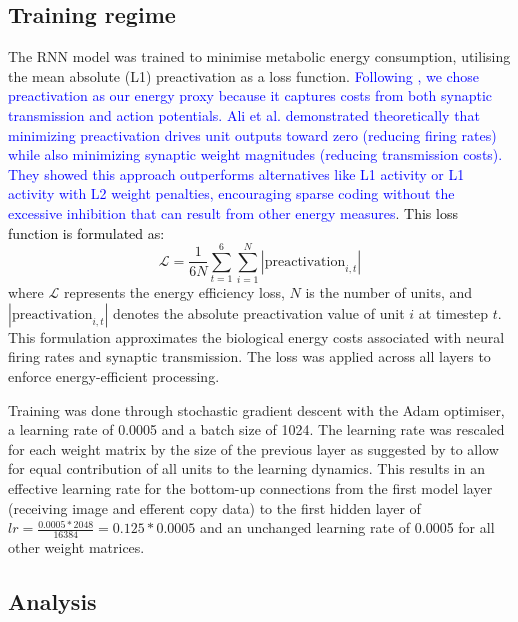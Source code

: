\documentclass[10pt,letterpaper]{article}
\begin{document}
\subsection{Training regime}
The RNN model was trained to minimise metabolic energy consumption, utilising the mean absolute (L1) preactivation as a loss function. \textcolor{blue}{Following \cite{ali_predictive_2022}, we chose preactivation as our energy proxy because it captures costs from both synaptic transmission and action potentials. Ali et al. demonstrated theoretically that minimizing preactivation drives unit outputs toward zero (reducing firing rates) while also minimizing synaptic weight magnitudes (reducing transmission costs). They showed this approach outperforms alternatives like L1 activity or L1 activity with L2 weight penalties, encouraging sparse coding without the excessive inhibition that can result from other energy measures}. \textcolor{black}{This loss function is formulated as:}
$$\mathcal{L} = \frac{1}{6N}\sum_{t=1}^{6}\sum_{i=1}^{N}|\text{preactivation}_{i,t}|$$
where $\mathcal{L}$ represents the energy efficiency loss, $N$ is the number of units, and $|\text{preactivation}_{i,t}|$ denotes the absolute preactivation value of unit $i$ at timestep $t$. This formulation approximates the biological energy costs associated with neural firing rates and synaptic transmission. The loss was applied across all layers to enforce energy-efficient processing.

Training was done through stochastic gradient descent with the Adam optimiser, a learning rate of 0.0005 and a batch size of 1024. The learning rate was rescaled for each weight matrix by the size of the previous layer as suggested by \cite{roberts_principles_2022} to allow for equal contribution of all units to the learning dynamics. This results in an effective learning rate for the bottom-up connections from the first model layer (receiving image and efferent copy data) to the first hidden layer of $lr = \frac{0.0005 * 2048}{16384} = 0.125 * 0.0005$ and an unchanged learning rate of 0.0005 for all other weight matrices.

\subsection{Analysis}
\end{document}
